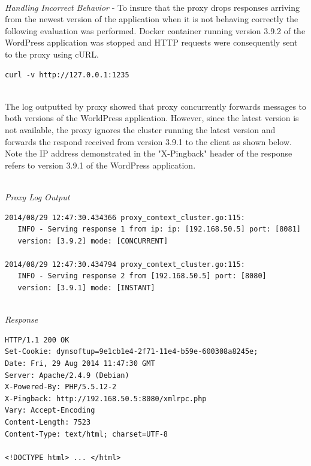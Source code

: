 \documentclass[a4paper,11pt,twoside]{report}
\begin{document}
\noindent\\
\textit{Handling Incorrect Behavior} - To insure that the proxy drops responses arriving from the newest version of the application when it is not behaving correctly the following evaluation was performed. Docker container running version 3.9.2 of the WordPress application was stopped and HTTP requests were consequently sent to the proxy using cURL.\smallskip

\begin{lstlisting}[language=terminal]
curl -v http://127.0.0.1:1235
\end{lstlisting}

\noindent\\
The log outputted by proxy showed that proxy concurrently forwards messages to both versions of the WorldPress application. However, since the latest version is not available, the proxy ignores the cluster running the latest version and forwards the respond received from version 3.9.1 to the client as shown below. Note the IP address demonstrated in the "X-Pingback" header of the response refers to version 3.9.1 of the WordPress application.    

\noindent\\
\textit{Proxy Log Output}
\begin{lstlisting}[language=terminal]
2014/08/29 12:47:30.434366 proxy_context_cluster.go:115:     
   INFO - Serving response 1 from ip: ip: [192.168.50.5] port: [8081] 
   version: [3.9.2] mode: [CONCURRENT]
   
2014/08/29 12:47:30.434794 proxy_context_cluster.go:115:     
   INFO - Serving response 2 from [192.168.50.5] port: [8080] 
   version: [3.9.1] mode: [INSTANT]
\end{lstlisting}


\noindent\\
\textit{Response}
\begin{lstlisting}[language=terminal] 
HTTP/1.1 200 OK
Set-Cookie: dynsoftup=9e1cb1e4-2f71-11e4-b59e-600308a8245e;
Date: Fri, 29 Aug 2014 11:47:30 GMT
Server: Apache/2.4.9 (Debian)
X-Powered-By: PHP/5.5.12-2
X-Pingback: http://192.168.50.5:8080/xmlrpc.php
Vary: Accept-Encoding
Content-Length: 7523
Content-Type: text/html; charset=UTF-8

<!DOCTYPE html> ... </html>
\end{lstlisting}
 
\end{document}
